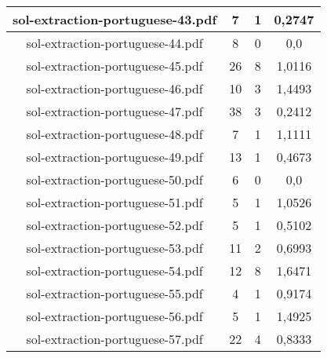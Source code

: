 \documentclass[11pt]{article}
\newlength\mylength
\begin{document}
\begin{center}
\begin{longtable}{||C{.40\mylength}||C{.30\mylength}||C{.30\mylength}||C{.30\mylength}||}
  sol-extraction-portuguese-43.pdf & 7 & 1 & 0,2747 \\  \hline
  sol-extraction-portuguese-44.pdf & 8 & 0 & 0,0 \\  \hline
  sol-extraction-portuguese-45.pdf & 26 & 8 & 1,0116 \\  \hline
  sol-extraction-portuguese-46.pdf & 10 & 3 & 1,4493 \\  \hline
  sol-extraction-portuguese-47.pdf & 38 & 3 & 0,2412 \\  \hline
  sol-extraction-portuguese-48.pdf & 7 & 1 & 1,1111 \\  \hline
  sol-extraction-portuguese-49.pdf & 13 & 1 & 0,4673 \\  \hline
  sol-extraction-portuguese-50.pdf & 6 & 0 & 0,0 \\  \hline
  sol-extraction-portuguese-51.pdf & 5 & 1 & 1,0526 \\  \hline
  sol-extraction-portuguese-52.pdf & 5 & 1 & 0,5102 \\  \hline
  sol-extraction-portuguese-53.pdf & 11 & 2 & 0,6993 \\  \hline
  sol-extraction-portuguese-54.pdf & 12 & 8 & 1,6471 \\  \hline
  sol-extraction-portuguese-55.pdf & 4 & 1 & 0,9174 \\  \hline
  sol-extraction-portuguese-56.pdf & 5 & 1 & 1,4925 \\  \hline
  sol-extraction-portuguese-57.pdf & 22 & 4 & 0,8333 \\  \hline

\end{longtable}
\end{center}
\end{document}
